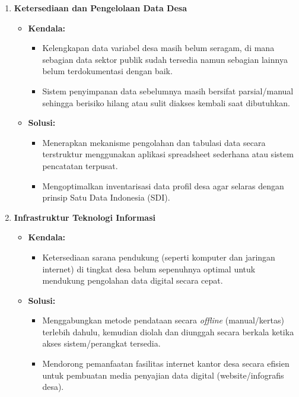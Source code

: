 \begin{enumerate}[label=\textbf{\arabic*.}]
  \item \textbf{Ketersediaan dan Pengelolaan Data Desa}
  \begin{itemize}
    \item \textbf{Kendala:}
    \begin{itemize}
      \item Kelengkapan data variabel desa masih belum seragam, di mana sebagian data sektor publik sudah tersedia namun sebagian lainnya belum terdokumentasi dengan baik.
      \item Sistem penyimpanan data sebelumnya masih bersifat parsial/manual sehingga berisiko hilang atau sulit diakses kembali saat dibutuhkan.
    \end{itemize}
    \item \textbf{Solusi:}
    \begin{itemize}
      \item Menerapkan mekanisme pengolahan dan tabulasi data secara terstruktur menggunakan aplikasi spreadsheet sederhana atau sistem pencatatan terpusat.
      \item Mengoptimalkan inventarisasi data profil desa agar selaras dengan prinsip Satu Data Indonesia (SDI).
    \end{itemize}
  \end{itemize}

  \item \textbf{Infrastruktur Teknologi Informasi}
  \begin{itemize}
    \item \textbf{Kendala:}
    \begin{itemize}
      \item Ketersediaan sarana pendukung (seperti komputer dan jaringan internet) di tingkat desa belum sepenuhnya optimal untuk mendukung pengolahan data digital secara cepat.
    \end{itemize}
    \item \textbf{Solusi:}
    \begin{itemize}
      \item Menggabungkan metode pendataan secara \textit{offline} (manual/kertas) terlebih dahulu, kemudian diolah dan diunggah secara berkala ketika akses sistem/perangkat tersedia.
      \item Mendorong pemanfaatan fasilitas internet kantor desa secara efisien untuk pembuatan media penyajian data digital (website/infografis desa).
    \end{itemize}
  \end{itemize}


\end{enumerate}

